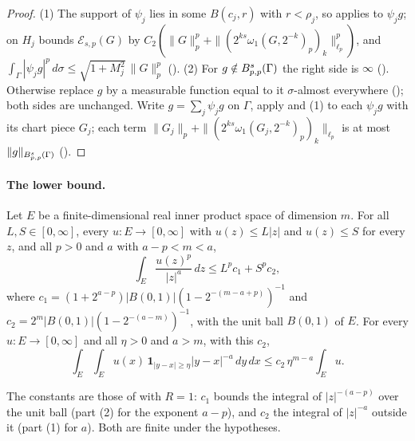 \begin{proof}
\leanok
(1) The support of $\psi_j$ lies in some $B(c_j, r)$ with $r < \rho_j$, so
 applies to $\psi_j g$;
 on $H_j$ bounds $\mathcal{E}_{s,p}(G)$ by
$C_2 (\|G\|_p^p + \|(2^{ks} \omega_1(G, 2^{-k})_p)_k\|_{\ell_p}^p)$, and
$\int_\Gamma |\psi_j g|^p \, d\sigma \leq \sqrt{1 + M_j^2} \, \|G\|_p^p$
(). (2) For $g \notin B^{s}_{p,p}(\Gamma)$ the right
side is $\infty$ (). Otherwise replace $g$ by a measurable
function equal to it $\sigma$-almost everywhere (); both sides
are unchanged. Write $g = \sum_j \psi_j g$ on $\Gamma$, apply 
and (1) to each $\psi_j g$ with its chart piece $G_j$; each term
$\|G_j\|_p + \|(2^{ks} \omega_1(G_j, 2^{-k})_p)_k\|_{\ell_p}$ is at most
$\|g\|_{B^{s}_{p,p}(\Gamma)}$ ().
\end{proof}

\paragraph{The lower bound.}

\begin{lemma}
\label{lem:radial-lipschitz-integral}
\leanok
{}
Let $E$ be a finite-dimensional real inner product space of dimension $m$. For all
$L, S \in [0, \infty]$, every $u \colon E \to [0, \infty]$ with $u(z) \leq L |z|$ and
$u(z) \leq S$ for every $z$, and all $p > 0$ and $a$ with $a - p < m < a$,
\[
  \int_E \frac{u(z)^p}{|z|^a} \, dz \leq L^p c_1 + S^p c_2 ,
\]
where $c_1 = (1 + 2^{a - p}) |B(0, 1)| (1 - 2^{-(m - a + p)})^{-1}$ and
$c_2 = 2^m |B(0, 1)| (1 - 2^{-(a - m)})^{-1}$, with the unit ball $B(0, 1)$ of $E$. For every
$u \colon E \to [0, \infty]$ and all $\eta > 0$ and $a > m$, with this $c_2$,
\[
  \int_E \int_E u(x) \, \mathbf 1_{|y - x| \geq \eta} |y - x|^{-a} \, dy \, dx
  \leq c_2 \, \eta^{m - a} \int_E u .
\]
\end{lemma}

The constants are those of  with $R = 1$: $c_1$ bounds the
integral of $|z|^{-(a - p)}$ over the unit ball (part (2) for the exponent $a - p$), and $c_2$
the integral of $|z|^{-a}$ outside it (part (1) for $a$). Both are finite under the hypotheses.

